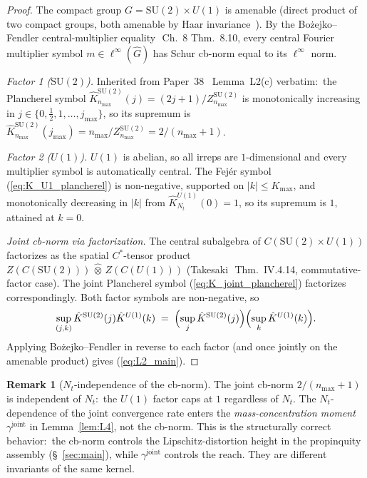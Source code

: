 \documentclass[11pt,a4paper]{article}
\theoremstyle{plain}
\theoremstyle{definition}
\newtheorem{remark}[theorem]{Remark}
\newcommand{\nmax}{n_{\max}}
\newcommand{\Nt}{N_{t}}
\newcommand{\Kmax}{K_{\max}}
\newcommand{\SU}{\mathrm{SU}}
\newcommand{\Uone}{U(1)}
\newcommand{\gammajoint}{\gamma^{\mathrm{joint}}}
\newcommand{\Plancherel}{\hat}
\begin{document}
\begin{proof}
The compact group $G = \SU(2) \times \Uone$ is amenable (direct product
of two compact groups, both amenable by Haar
invariance~\cite{pier1984,bekka_harpe_valette2008}). By the
Bo\.zejko--Fendler central-multiplier
equality~\cite{bozejko_fendler1991,pisier2001}\,Ch.~8 Thm.~8.10, every
central Fourier multiplier symbol $m \in \ell^{\infty}(\hat G)$ has Schur
cb-norm equal to its $\ell^{\infty}$ norm.

\emph{Factor 1 ($\SU(2)$).} Inherited from Paper~38~\cite{paper38}
Lemma~L2(c) verbatim:\ the Plancherel symbol
$\Plancherel{K}^{\SU(2)}_{\nmax}(j) = (2j + 1)/Z^{\SU(2)}_{\nmax}$ is
monotonically increasing in $j \in \{0, \tfrac{1}{2}, 1, \ldots,
j_{\max}\}$, so its supremum is
$\Plancherel{K}^{\SU(2)}_{\nmax}(j_{\max}) = \nmax /
Z^{\SU(2)}_{\nmax} = 2/(\nmax + 1)$.

\emph{Factor 2 ($\Uone$).} $\Uone$ is abelian, so all irreps are
$1$-dimensional and every multiplier symbol is automatically central.
The Fej\'er symbol (\ref{eq:K_U1_plancherel}) is non-negative,
supported on $|k| \le \Kmax$, and monotonically decreasing in $|k|$
from $\Plancherel{K}^{\Uone}_{\Nt}(0) = 1$, so its supremum is
$1$, attained at $k = 0$.

\emph{Joint cb-norm via factorization.} The central subalgebra of
$C(\SU(2) \times \Uone)$ factorizes as the spatial $C^{\ast}$-tensor
product $Z(C(\SU(2))) \,\hat\otimes\, Z(C(\Uone))$
(Takesaki~\cite{takesaki1979}\,Thm.~IV.4.14, commutative-factor case).
The joint Plancherel symbol (\ref{eq:K_joint_plancherel}) factorizes
correspondingly. Both factor symbols are non-negative, so
\begin{equation*}
   \sup_{(j, k)} \Plancherel{K}^{\SU(2)}(j) \Plancherel{K}^{\Uone}(k)
   \;=\; \Bigl(\sup_{j} \Plancherel{K}^{\SU(2)}(j)\Bigr)
        \Bigl(\sup_{k} \Plancherel{K}^{\Uone}(k)\Bigr).
\end{equation*}
Applying Bo\.zejko--Fendler in reverse to each factor (and once jointly
on the amenable product) gives (\ref{eq:L2_main}). \qedhere
\end{proof}

\begin{remark}[$\Nt$-independence of the cb-norm]\label{rem:cb_Nt_indep}
The joint cb-norm $2/(\nmax + 1)$ is independent of $\Nt$:\ the
$\Uone$ factor caps at $1$ regardless of $\Nt$. The $\Nt$-dependence
of the joint convergence rate enters the \emph{mass-concentration
moment} $\gammajoint$ in Lemma~\ref{lem:L4}, not the cb-norm. This is
the structurally correct behavior:\ the cb-norm controls the
Lipschitz-distortion height in the propinquity assembly
(\S~\ref{sec:main}), while $\gammajoint$ controls the reach. They are
different invariants of the same kernel.
\end{remark}
\end{document}

